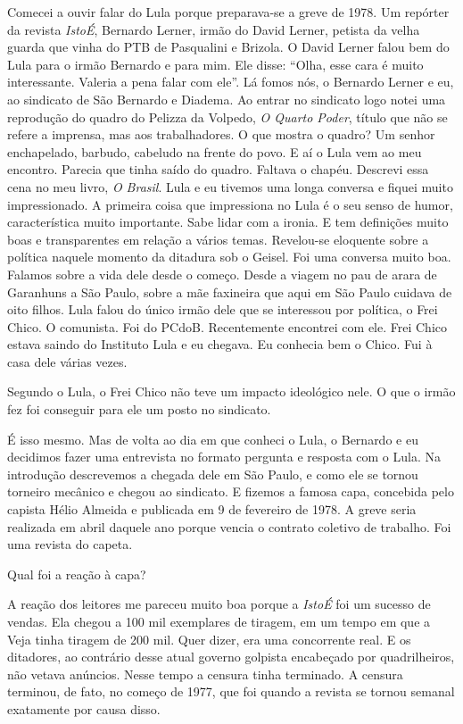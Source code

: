  Comecei a ouvir falar do Lula porque preparava-se a greve de 1978. Um
repórter da revista \emph{IstoÉ}, Bernardo Lerner, irmão do David
Lerner, petista da velha guarda que vinha do PTB de Pasqualini e
Brizola. O David Lerner falou bem do Lula para o irmão Bernardo e para
mim. Ele disse: ``Olha, esse cara é muito interessante. Valeria a pena
falar com ele''. Lá fomos nós, o Bernardo Lerner e eu, ao sindicato de
São Bernardo e Diadema. Ao entrar no sindicato logo notei uma reprodução
do quadro do Pelizza da Volpedo, \emph{O Quarto Poder}, título que não
se refere a imprensa, mas aos trabalhadores. O que mostra o quadro? Um
senhor enchapelado, barbudo, cabeludo na frente do povo. E aí o Lula vem
ao meu encontro. Parecia que tinha saído do quadro. Faltava o chapéu.
Descrevi essa cena no meu livro, \emph{O Brasil}. Lula e eu tivemos uma
longa conversa e fiquei muito impressionado. A primeira coisa que
impressiona no Lula é o seu senso de humor, característica muito
importante. Sabe lidar com a ironia. E tem definições muito boas e
transparentes em relação a vários temas. Revelou-se eloquente sobre a
política naquele momento da ditadura sob o Geisel. Foi uma conversa
muito boa. Falamos sobre a vida dele desde o começo. Desde a viagem no
pau de arara de Garanhuns a São Paulo, sobre a mãe faxineira que aqui em
São Paulo cuidava de oito filhos. Lula falou do único irmão dele que se
interessou por política, o Frei Chico. O comunista. Foi do PCdoB.
Recentemente encontrei com ele. Frei Chico estava saindo do Instituto
Lula e eu chegava. Eu conhecia bem o Chico. Fui à casa dele várias
vezes.

 Segundo o Lula, o Frei Chico não teve um impacto ideológico nele. O
que o irmão fez foi conseguir para ele um posto no sindicato.

 É isso mesmo. Mas de volta ao dia em que conheci o Lula, o Bernardo e
eu decidimos fazer uma entrevista no formato pergunta e resposta com o
Lula. Na introdução descrevemos a chegada dele em São Paulo, e como ele
se tornou torneiro mecânico e chegou ao sindicato. E fizemos a famosa
capa, concebida pelo capista Hélio Almeida e publicada em 9 de fevereiro
de 1978. A greve seria realizada em abril daquele ano porque vencia o
contrato coletivo de trabalho. Foi uma revista do capeta.

 Qual foi a reação à capa?

 A reação dos leitores me pareceu muito boa porque a \emph{IstoÉ} foi
um sucesso de vendas. Ela chegou a 100 mil exemplares de tiragem, em um
tempo em que a Veja tinha tiragem de 200 mil. Quer dizer, era uma
concorrente real. E os ditadores, ao contrário desse atual governo
golpista encabeçado por quadrilheiros, não vetava anúncios. Nesse tempo
a censura tinha terminado. A censura terminou, de fato, no começo de
1977, que foi quando a revista se tornou semanal exatamente por causa
disso.

